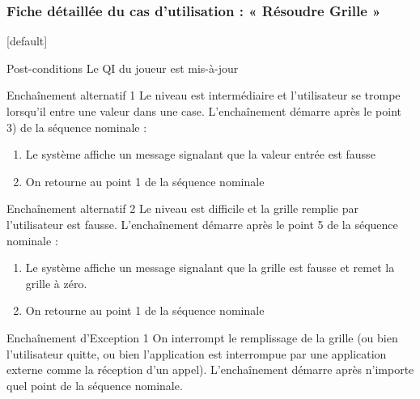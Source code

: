 \documentclass{beamer}
\begin{document}
\begin{frame}
  \frametitle{Fiche détaillée du cas d'utilisation : « Résoudre Grille »}
  [default]
  \begin{block}{\footnotesize{Post-conditions}}
    \scriptsize{Le QI du joueur est mis-à-jour}
  \end{block}
  \pause
  \begin{block}{\footnotesize{Enchaînement alternatif 1}}
    \scriptsize{Le niveau est intermédiaire et l’utilisateur se trompe lorsqu’il entre une valeur dans une case. L’enchaînement démarre après le point 3) de la séquence nominale :}
    \begin{enumerate}    
      [circle]
      \item
        \scriptsize{Le système affiche un message signalant que la valeur entrée est fausse}
      \item
        \scriptsize{On retourne au point 1 de la séquence nominale}
    \end{enumerate}
  \end{block}
  \pause
  \begin{block}{\footnotesize{Enchaînement alternatif 2}}
    \scriptsize{Le niveau est difficile et la grille remplie par l’utilisateur est fausse. L’enchaînement démarre après le point 5 de la séquence nominale :}
    \begin{enumerate}    
      [circle]
    \item
      \scriptsize{Le système affiche un message signalant que la grille est fausse et remet la grille à zéro.}
    \item
      \scriptsize{On retourne au point 1 de la séquence nominale}
    \end{enumerate}
  \end{block}
  \pause
  \begin{block}{\footnotesize{Enchaînement d’Exception 1}}
    \scriptsize{On interrompt le remplissage de la grille (ou bien l’utilisateur quitte, ou bien l’application est interrompue par une application externe comme la réception d’un appel).
L’enchaînement démarre après n’importe quel point de la séquence nominale.}
  \end{block}
\end{frame}
\end{document}
